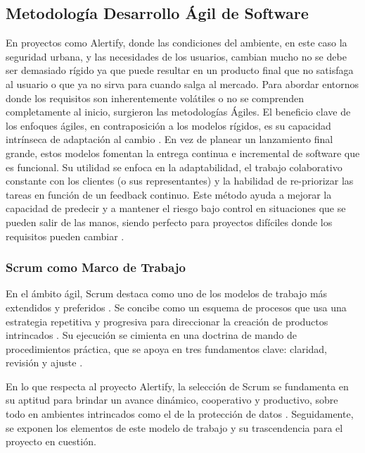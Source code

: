 \subsection{Metodología Desarrollo Ágil de Software}

En proyectos como Alertify, donde las condiciones del ambiente, en este caso la seguridad urbana, y las necesidades de los usuarios, cambian mucho no se debe ser demasiado rígido ya que puede resultar en un producto final que no satisfaga al usuario o que ya no sirva para cuando salga al mercado.
Para abordar entornos donde los requisitos son inherentemente volátiles o no se comprenden completamente al inicio, surgieron las metodologías Ágiles. El beneficio clave de los enfoques ágiles, en contraposición a los modelos rígidos, es su capacidad intrínseca de adaptación al cambio \cite{arvanitou2021software}.  En vez de planear un lanzamiento final grande, estos modelos fomentan la entrega continua e incremental de software que es funcional. Su utilidad se enfoca en la adaptabilidad, el trabajo colaborativo constante con los clientes (o sus representantes) y la habilidad de re-priorizar las tareas en función de un feedback continuo\cite{moniruzzaman2013comparative}.
Este método ayuda a mejorar la capacidad de predecir y a mantener el riesgo bajo control en situaciones que se pueden salir de las manos, siendo perfecto para proyectos difíciles donde los requisitos pueden cambiar \cite{schwaber2013guia}.

\subsubsection{Scrum como Marco de Trabajo}
En el ámbito ágil, Scrum destaca como uno de los modelos de trabajo más extendidos y preferidos \cite{dixit2019scrum}. Se concibe como un esquema de procesos que usa una estrategia repetitiva y progresiva para direccionar la creación de productos intrincados \cite{schwaber2013guia}. Su ejecución se cimienta en una doctrina de mando de procedimientos práctica, que se apoya en tres fundamentos clave: claridad, revisión y ajuste \cite{schwaber2013guia}.

En lo que respecta al proyecto Alertify, la selección de Scrum se fundamenta en su aptitud para brindar un avance dinámico, cooperativo y productivo, sobre todo en ambientes intrincados como el de la protección de datos \cite{manssur2015aplicacion}. Seguidamente, se exponen los elementos de este modelo de trabajo y su trascendencia para el proyecto en cuestión.

